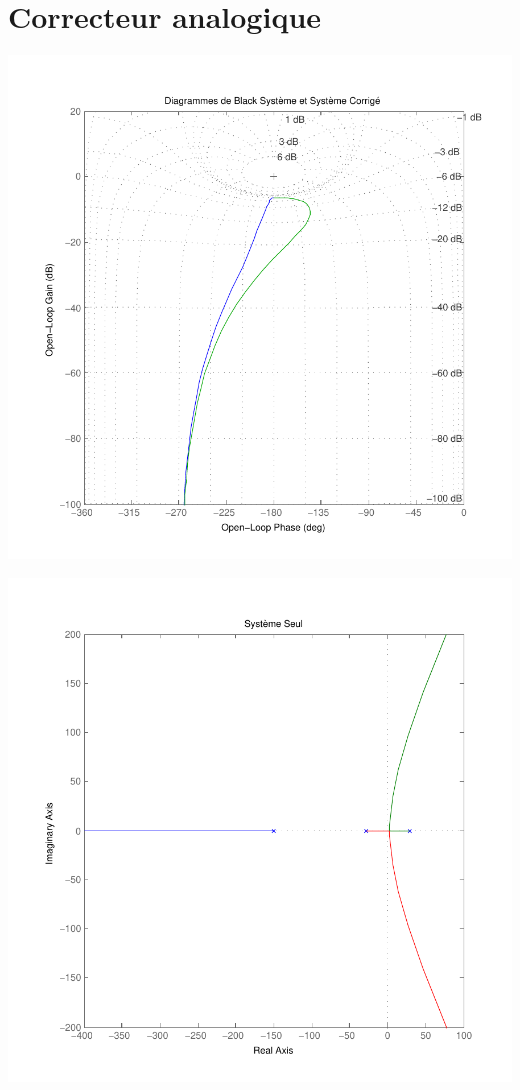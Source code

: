 \documentclass[11pt, french]{article} %
\begin{document}
\section{Correcteur analogique}


\includegraphics[scale=0.50]{MatBlackFredValues.pdf}

\includegraphics[scale=0.50]{RL_Sys_Seul.pdf}
\end{document}
